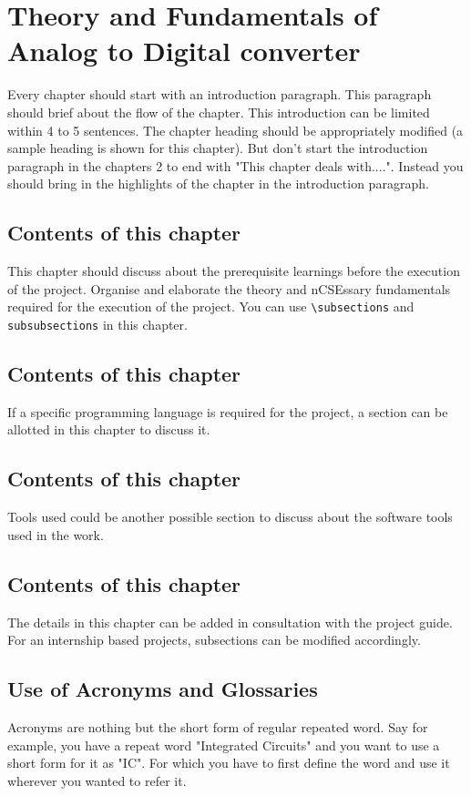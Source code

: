 \chapter{Theory and Fundamentals of Analog to Digital converter}

Every chapter should start with an introduction paragraph. This paragraph should brief about the flow of the chapter. This introduction can be limited within 4 to 5 sentences. The chapter heading should be appropriately modified (a sample heading is shown for this chapter). But don't start the introduction paragraph in the chapters 2 to end with "This chapter deals with....". Instead you should bring in the highlights of the chapter in the introduction paragraph.

\section{Contents of this chapter}

This chapter should discuss about the prerequisite learnings before the execution of the project. Organise and elaborate the theory and nCSEssary fundamentals required for the execution of the project. You can use \verb|\subsections| and \verb|subsubsections| in this chapter.
\section{Contents of this chapter}
If a specific programming language is required for the project, a section can be allotted in this chapter to discuss it. 
\section{Contents of this chapter}
Tools used could be another possible section to discuss about the software tools used in the work. 
\section{Contents of this chapter}
The details in this chapter can be added in consultation with the project guide. For an internship based projects, subsections can be modified accordingly. 

\section{Use of Acronyms and Glossaries}
Acronyms are nothing but the short form of regular repeated word. Say for example, you have a repeat word "Integrated Circuits" and you want to use a short form for it as "IC". For which you have to first define the word and use it wherever you wanted to refer it.

